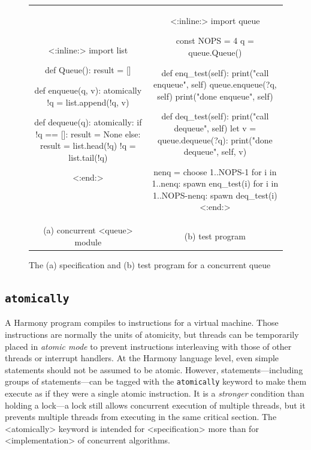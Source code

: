 \documentclass[twocolumn]{article}
\begin{document}
\begin{figure}[h]
\begin{center}
\begin{tabular}{cc}
{\footnotesize
\begin{tcolorbox}[width=0.45\linewidth]
<{:inline:}>
import list

def Queue():
    result = []

def enqueue(q, v):
    atomically !q = list.append(!q, v)

def dequeue(q):
    atomically:
        if !q == []:
            result = None
        else:
            result = list.head(!q)
            !q = list.tail(!q)



<{:end:}>
\end{tcolorbox}
}
&
{\footnotesize
\begin{tcolorbox}[width=0.48\linewidth]
<{:inline:}>
import queue

const NOPS = 4
q = queue.Queue()

def enq_test(self):
    print("call enqueue", self)
    queue.enqueue(?q, self)
    print("done enqueue", self)

def deq_test(self):
    print("call dequeue", self)
    let v = queue.dequeue(?q):
        print("done dequeue", self, v)

nenq = choose {1..NOPS-1}
for i in {1..nenq}:      spawn enq_test(i)
for i in {1..NOPS-nenq}: spawn deq_test(i)
<{:end:}>
\end{tcolorbox}
}
\\
(a) concurrent <{queue}> module & (b) test program
\end{tabular}
\end{center}
\caption{The (a) specification and (b) test program for a concurrent queue}
\label{fig:queue}
\end{figure}

\subsection{\texttt{atomically}}

A Harmony program compiles to instructions for a virtual machine.
Those instructions are normally the units of atomicity, but threads
can be temporarily placed in \emph{atomic mode} to prevent instructions
interleaving with those of other threads or interrupt handlers.
At the Harmony language level, even simple statements should not be
assumed to be atomic.
However, statements---including groups of statements---can be tagged with
the \texttt{atomically} keyword to make them execute as if they were
a single atomic instruction.
It is
a \emph{stronger} condition than holding a lock---a lock still allows
concurrent execution of multiple threads, but it prevents multiple
threads from executing in the same critical section.
The <{atomically}> keyword is intended for <{specification}> more than
for <{implementation}> of concurrent algorithms.
\end{document}
